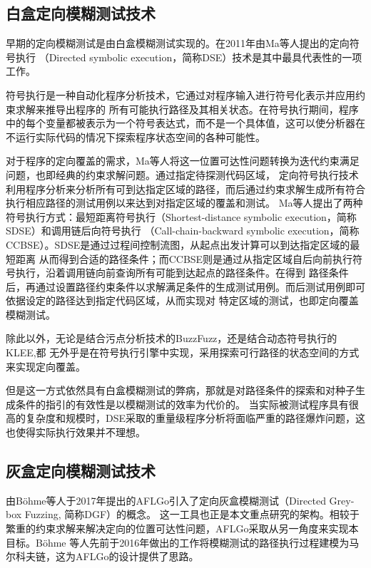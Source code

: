 \documentclass[bachelor]{njupthesis}
\begin{document}
\subsection{白盒定向模糊测试技术}
早期的定向模糊测试是由白盒模糊测试实现的。在2011年由Ma等人提出的定向符号执行\cite{ma2011directed}
（Directed symbolic execution，简称DSE）技术是其中最具代表性的一项工作。

符号执行\cite{king1976select}是一种自动化程序分析技术，它通过对程序输入进行符号化表示并应用约束求解来推导出程序的
所有可能执行路径及其相关状态。在符号执行期间，程序中的每个变量都被表示为一个符号表达式，而不是一个具体值，这可以使分析器在
不运行实际代码的情况下探索程序状态空间的各种可能性。

对于程序的定向覆盖的需求，Ma等人将这一位置可达性问题转换为迭代约束满足问题，也即经典的约束求解问题。通过指定待探测代码区域，
定向符号执行技术利用程序分析来分析所有可到达指定区域的路径，而后通过约束求解生成所有符合执行相应路径的测试用例以来达到对指定区域的覆盖和测试。
Ma等人提出了两种符号执行方式：最短距离符号执行（Shortest-distance symbolic execution，简称SDSE）和调用链后向符号执行
（Call-chain-backward symbolic execution，简称CCBSE）。SDSE是通过过程间控制流图，从起点出发计算可以到达指定区域的最短距离
从而得到合适的路径条件；而CCBSE则是通过从指定区域自后向前执行符号执行，沿着调用链向前查询所有可能到达起点的路径条件。在得到
路径条件后，再通过设置路径约束条件以求解满足条件的生成测试用例。而后测试用例即可依据设定的路径达到指定代码区域，从而实现对
特定区域的测试，也即定向覆盖模糊测试。

除此以外，无论是结合污点分析技术的BuzzFuzz\cite{ganesh2009taint}，还是结合动态符号执行的KLEE\cite{cadar2008klee},都
无外乎是在符号执行引擎中实现，采用探索可行路径的状态空间的方式来实现定向覆盖。

但是这一方式依然具有白盒模糊测试的弊病，那就是对路径条件的探索和对种子生成条件的指引的有效性是以模糊测试的效率为代价的。
当实际被测试程序具有很高的复杂度和规模时，DSE采取的重量级程序分析将面临严重的路径爆炸问题，这也使得实际执行效果并不理想。
\subsection{灰盒定向模糊测试技术}
由B{\"o}hme等人于2017年提出的AFLGo\cite{bohmeDGF2017}引入了定向灰盒模糊测试（Directed Grey-box Fuzzing, 简称DGF）的概念。
这一工具也正是本文重点研究的架构。相较于繁重的约束求解来解决定向的位置可达性问题，AFLGo采取从另一角度来实现本目标。B{\"o}hme
等人先前于2016年做出的工作\cite{2016Coverage}将模糊测试的路径执行过程建模为马尔科夫链，这为AFLGo的设计提供了思路。
\end{document}
